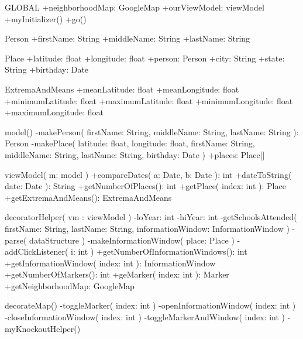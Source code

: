 
GLOBAL
  +neighborhoodMap: GoogleMap
  +ourViewModel: viewModel
  +myInitializer()
  +go()

Person
  +firstName: String
  +middleName: String
  +lastName: String

Place
  +latitude: float
  +longitude: float
  +person: Person
  +city: String
  +state: String
  +birthday: Date

ExtremaAndMeans
  +meanLatitude: float
  +meanLongitude: float
  +minimumLatitude: float
  +maximumLatitude: float
  +minimumLongitude: float
  +maximumLongitude: float

model()
  -makePerson( firstName: String, middleName: String, lastName: String ): Person
  -makePlace( latitude: float, longitude: float, firstName: String, middleName: String, lastName: String, birthday: Date )
  +places: Place[]

viewModel( m: model )
  +compareDates( a: Date, b: Date ): int
  +dateToString( date: Date ): String
  +getNumberOfPlaces(): int
  +getPlace( index: int ): Place
  +getExtremaAndMeans(): ExtremaAndMeans

decoratorHelper( vm : viewModel )
  -loYear: int
  -hiYear: int
  -getSchoolsAttended( firstName: String, lastName: String, informationWindow: InformationWindow )
    -parse( dataStructure )
  -makeInformationWindow( place: Place )
  -addClickListener( i: int )
  +getNumberOfInformationWindows(): int
  +getInformationWindow( index: int ): InformationWindow
  +getNumberOfMarkers(): int
  +geMarker( index: int ): Marker
  +getNeighborhoodMap: GoogleMap

decorateMap()
  -toggleMarker( index: int )
  -openInformationWindow( index: int )
  -closeInformationWindow( index: int )
  -toggleMarkerAndWindow( index: int )
  -myKnockoutHelper()

